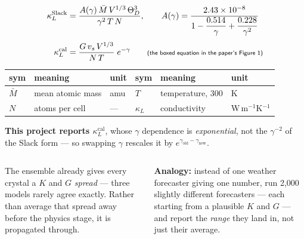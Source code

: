 \documentclass[aspectratio=169]{beamer}
\begin{document}
\begin{frame}

\begin{align}
\kappa_L^{\text{Slack}} &=
  \frac{A(\gamma)\,\bar{M}\,V^{1/3}\,\Theta_D^{3}}{\gamma^{2}\,T\,N},
  \qquad A(\gamma) = \frac{2.43\times10^{-8}}{1 - \dfrac{0.514}{\gamma} + \dfrac{0.228}{\gamma^{2}}} \\[3pt]
\kappa_L^{\text{cal}} &= \frac{G\,v_s\,V^{1/3}}{N\,T}\;e^{-\gamma}
  \qquad\text{\sffamily\scriptsize (the boxed equation in the paper's Figure 1)}
\end{align}

\vspace{1pt}
\begin{center}
{\sffamily\scriptsize
\begin{tabular}{@{}llllll@{}}
\toprule
sym & meaning & unit & sym & meaning & unit \\
\midrule
$\bar{M}$ & mean atomic mass & amu & $T$ & temperature, 300 & K \\
$N$ & atoms per cell & --- & $\kappa_L$ & conductivity & W\,m$^{-1}$K$^{-1}$ \\
\bottomrule
\end{tabular}}
\end{center}

\vspace{1pt}
{\sffamily\scriptsize
\textbf{This project reports $\kappa_L^{\text{cal}}$}, whose $\gamma$ dependence
is \emph{exponential}, not the $\gamma^{-2}$ of the Slack form --- so swapping
$\gamma$ rescales it by $e^{\gamma_{\text{old}} - \gamma_{\text{new}}}$.}
\end{frame}

\begin{frame}

\begin{columns}[T]
{\sffamily\small
The ensemble already gives every crystal a $K$ and $G$ \emph{spread} ---
three models rarely agree exactly. Rather than average that spread away
before the physics stage, it is propagated through.}

\vspace{4pt}

{\sffamily\small
\textbf{Analogy:} instead of one weather forecaster giving one number, run
2{,}000 slightly different forecasters --- each starting from a plausible
$K$ and $G$ --- and report the \emph{range} they land in, not just their
average.}
\end{columns}

\end{frame}
\end{document}
